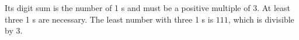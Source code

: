 Its digit sum is the number of 1 s and must be a positive multiple of 3. At least three 1 s are necessary. The least number with three 1 s is $\boxed{111}$, which is divisible by 3.
